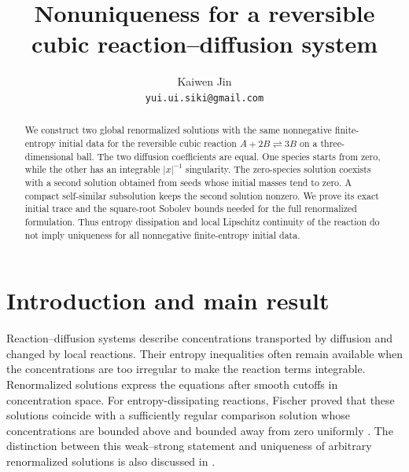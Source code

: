 \documentclass[11pt]{article}
\title{Nonuniqueness for a reversible cubic reaction--diffusion system}
\author{Kaiwen Jin\\\texttt{yui.ui.siki@gmail.com}}
\date{}
\theoremstyle{definition}
\begin{document}
\maketitle
\begin{abstract}
We construct two global renormalized solutions with the same nonnegative
finite-entropy initial data for the reversible cubic reaction
$A+2B\rightleftharpoons3B$ on a three-dimensional ball. The two diffusion
coefficients are equal. One species starts from zero, while the other has an
integrable $|x|^{-1}$ singularity. The zero-species solution coexists with a
second solution obtained from seeds whose initial masses tend to zero.
A compact self-similar subsolution keeps the second solution nonzero.
We prove its exact initial trace and the square-root Sobolev bounds needed
for the full renormalized formulation. Thus entropy dissipation and local
Lipschitz continuity of the reaction do not imply uniqueness for all
nonnegative finite-entropy initial data.
\end{abstract}

\section{Introduction and main result}

Reaction--diffusion systems describe concentrations transported by diffusion
and changed by local reactions. Their entropy inequalities often remain
available when the concentrations are too irregular to make the reaction
terms integrable. Renormalized solutions express the equations after smooth
cutoffs in concentration space. For entropy-dissipating reactions, Fischer
proved that these solutions coincide with a sufficiently regular comparison
solution whose concentrations are bounded above and bounded away from zero
uniformly \cite[Definition~2 and Theorem~7, preprint version]{Fischer2017}. The distinction between this
weak--strong statement and uniqueness of arbitrary renormalized solutions
is also discussed in \cite[Remark~1.4]{FFKT2023}.
\end{document}
